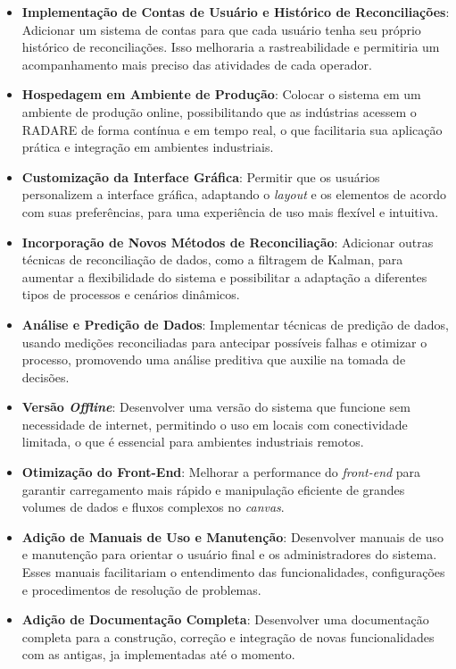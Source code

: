 \begin{itemize}
    \item \textbf{Implementação de Contas de Usuário e Histórico de Reconciliações}: Adicionar um sistema de contas para que cada usuário tenha seu próprio histórico de reconciliações. Isso melhoraria a rastreabilidade e permitiria um acompanhamento mais preciso das atividades de cada operador.

    \item \textbf{Hospedagem em Ambiente de Produção}: Colocar o sistema em um ambiente de produção online, possibilitando que as indústrias acessem o RADARE de forma contínua e em tempo real, o que facilitaria sua aplicação prática e integração em ambientes industriais.

    \item \textbf{Customização da Interface Gráfica}: Permitir que os usuários personalizem a interface gráfica, adaptando o \textit{layout} e os elementos de acordo com suas preferências, para uma experiência de uso mais flexível e intuitiva.

    \item \textbf{Incorporação de Novos Métodos de Reconciliação}: Adicionar outras técnicas de reconciliação de dados, como a filtragem de Kalman, para aumentar a flexibilidade do sistema e possibilitar a adaptação a diferentes tipos de processos e cenários dinâmicos.

    \item \textbf{Análise e Predição de Dados}: Implementar técnicas de predição de dados, usando medições reconciliadas para antecipar possíveis falhas e otimizar o processo, promovendo uma análise preditiva que auxilie na tomada de decisões.

    \item \textbf{Versão \textit{Offline}}: Desenvolver uma versão do sistema que funcione sem necessidade de internet, permitindo o uso em locais com conectividade limitada, o que é essencial para ambientes industriais remotos.

    \item \textbf{Otimização do Front-End}: Melhorar a performance do \textit{front-end} para garantir carregamento mais rápido e manipulação eficiente de grandes volumes de dados e fluxos complexos no \textit{canvas}.
    
    \item \textbf{Adição de Manuais de Uso e Manutenção}: Desenvolver manuais  de uso e manutenção para orientar o usuário final e os administradores do sistema. Esses manuais facilitariam o entendimento das funcionalidades, configurações e procedimentos de resolução de problemas.

    \item \textbf{Adição de Documentação Completa}: Desenvolver uma documentação completa para a construção, correção e integração de novas funcionalidades com as antigas, ja implementadas até o momento. 

\end{itemize}

